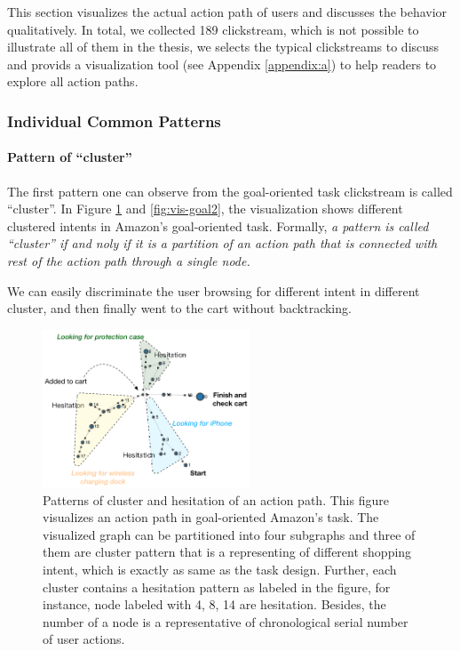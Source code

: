 This section visualizes the actual action path of users and discusses the behavior qualitatively.
In total, we collected 189 clickstream, which is not possible to illustrate all of them
in the thesis, we selects the typical clickstreams to discuss and provids a visualization tool
(see Appendix \ref{appendix:a}) to help readers to explore all action paths.

\subsubsection{Individual Common Patterns}

\paragraph{Pattern of ``cluster''}
The first pattern one can observe from the goal-oriented task clickstream is called ``cluster''.
In Figure \ref{fig:vis-goal1} and \ref{fig:vis-goal2}, 
the visualization shows different clustered intents in Amazon's goal-oriented task. 
Formally, \emph{a pattern is called ``cluster'' if and noly if it is a partition of an action path
that is connected with rest of the action path through a single node.}

We can easily discriminate the user browsing for 
different intent in different cluster, and then finally went to the cart without
backtracking.

\begin{figure}[H]
    \centering
    \includegraphics[width=0.55\textwidth]{figures/vis-goal1}
    \caption{Patterns of cluster and hesitation of an action path. This figure visualizes an action path in
    goal-oriented Amazon's task. The visualized graph can be partitioned into four subgraphs
    and three of them are cluster pattern that is a representing of different shopping intent, 
    which is exactly as same as the task design. Further, each cluster contains a hesitation pattern
    as labeled in the figure, for instance, node labeled with 4, 8, 14 are hesitation. 
    Besides, the number of a node is a representative of chronological serial number of user actions.}
    \label{fig:vis-goal1}
\end{figure}

